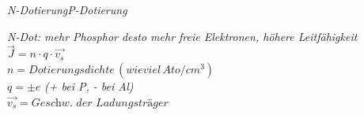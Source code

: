 \documentclass[a4paper, 6pt, landscape]{scrartcl}
\newcommand{\dis}[1]{\hspace{#1cm}}
\begin{document}
\begin{multicols*}{4}
\begin{minipage}[t]{0.45\columnwidth}
        \textit{N-Dotierung}\dis{0.15}\textit{P-Dotierung}
      \end{minipage}
      \begin{minipage}[t]{0.55\columnwidth}
        \vspace{-1.25cm}
        \textit{N-Dot: mehr Phosphor desto mehr freie Elektronen, höhere Leitfähigkeit}\\
        $\vec{J}=n\cdot q\cdot\vec{v_s}$\\
        $n= Dotierungsdichte\,(wieviel\,Ato/cm^3)$\\
        $q=\pm e$\textit{ (+ bei P, - bei Al)}\\
        $\vec{v_s}=\textit{Geschw. der Ladungsträger}$\\
      \end{minipage}










\newpage


\end{multicols*}
\end{document}

